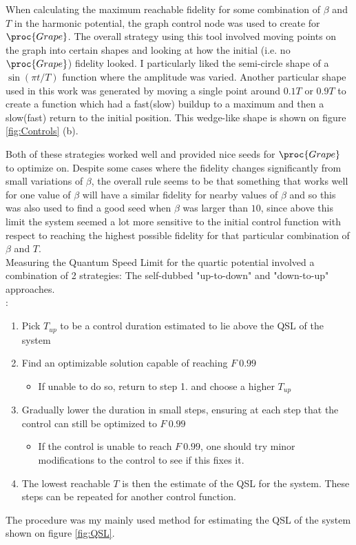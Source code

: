\documentclass[aps,pra,reprint,superscriptaddress]{revtex4-1}
\begin{document}
When calculating the maximum reachable fidelity for some combination of $\beta$ and $T$ in the harmonic potential, the graph control node was used to create for $\proc{Grape}$. The overall strategy using this tool involved moving points on the graph into certain shapes and looking at how the initial (i.e. no $\proc{Grape}$) fidelity looked. I particularly liked the semi-circle shape of a $\sin(\pi t/T)$ function where the amplitude was varied. Another particular shape used in this work was generated by moving a single point around $0.1T$ or $0.9T$ to create a function which had a fast(slow) buildup to a maximum and then a slow(fast) return to the initial position. This wedge-like shape is shown on figure \ref{fig:Controls} (b).

Both of these strategies worked well and provided nice seeds for $\proc{Grape}$ to optimize on. Despite some cases where the fidelity changes significantly from small variations of $\beta$, the overall rule seems to be that something that works well for one value of $\beta$ will have a similar fidelity for nearby values of $\beta$ and so this was also used to find a good seed when $\beta$ was larger than $10$, since above this limit the system seemed a lot more sensitive to the initial control function with respect to reaching the highest possible fidelity for that particular combination of $\beta$ and $T$. \\

Measuring the Quantum Speed Limit for the quartic potential involved a combination of 2 strategies: The self-dubbed "up-to-down" and "down-to-up" approaches. \\

:
\begin{enumerate}
	\item Pick $T_{up}$ to be a control duration estimated to lie above the QSL of the system
	\item Find an optimizable solution capable of reaching $F~0.99$
	\begin{itemize}
		\item If unable to do so, return to step 1. and choose a higher $T_{up}$
	\end{itemize}
	\item Gradually lower the duration in small steps, ensuring at each step that the control can still be optimized to $F~0.99$
	\begin{itemize}
		\item If the control is unable to reach $F~0.99$, one should try minor modifications to the control to see if this fixes it.
	\end{itemize}
	\item The lowest reachable $T$ is then the estimate of the QSL for the system. These steps can be repeated for another control function.
\end{enumerate}
The  procedure was my mainly used method for estimating the QSL of the system shown on figure \ref{fig:QSL}.\\
\end{document}
